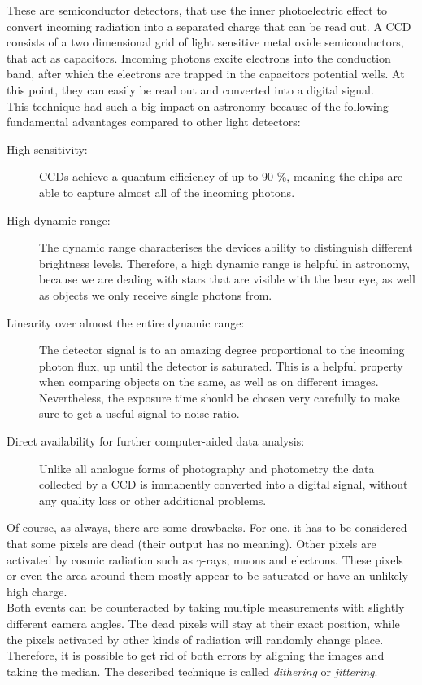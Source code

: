  These are semiconductor detectors, that use the inner photoelectric effect to convert incoming radiation into a separated charge that can be read out. A CCD consists of a two dimensional grid of light sensitive metal oxide semiconductors, that act as capacitors. Incoming photons excite electrons into the conduction band, after which the electrons are trapped in the capacitors potential wells. At this point, they can easily be read out and converted into a digital signal. \\
This technique had such a big impact on astronomy because of the following fundamental advantages compared to other light detectors:

\begin{description}
	\item[High sensitivity:] CCDs achieve a quantum efficiency of up to 90 \%, meaning the chips are  able to capture almost all of the incoming photons.
	\item[High dynamic range:] The dynamic range characterises the devices ability to distinguish different brightness levels.  Therefore, a high dynamic range is helpful in astronomy, because we are dealing with stars that are visible with the bear eye, as well as objects we only receive single photons from.
	\item[Linearity over almost the entire dynamic range:] The detector signal is to an amazing degree proportional to the incoming photon flux, up until the detector is saturated. This is a helpful property when comparing objects on the same, as well as on different images. Nevertheless, the exposure time should be chosen very carefully to make sure to get a useful signal to noise ratio.
	\item[Direct availability for further computer-aided data analysis:] Unlike all analogue forms of photography and photometry the data collected by a CCD is immanently converted into a digital signal, without any quality loss or other additional problems. 
\end{description}

Of course, as always, there are some drawbacks. For one, it has to be considered that some pixels are dead (their output has no meaning). Other pixels are activated by cosmic radiation such as $\gamma$-rays, muons and electrons. These pixels or even the area around them mostly appear to be saturated or have an unlikely high charge.\\
Both events can be counteracted by taking multiple measurements with slightly different camera angles. The dead pixels will stay at their exact position, while the pixels activated by other kinds of radiation will randomly change place. Therefore, it is possible to get rid of both errors by aligning the images and taking the median. The described technique is called \textit{dithering} or \textit{jittering}.

